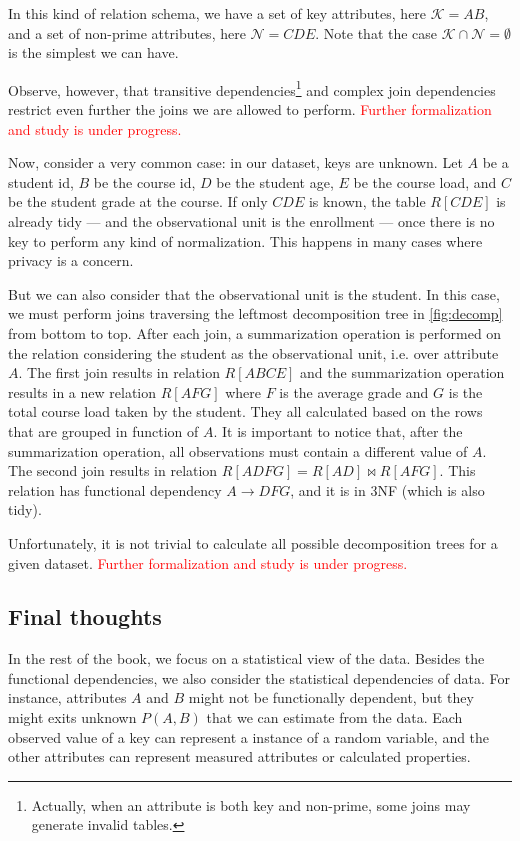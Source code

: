 In this kind of relation schema, we have a set of key attributes, here $\mathcal{K} = AB$,
and a set of non-prime attributes, here $\mathcal{N} = CDE$.  Note that the case
$\mathcal{K} \cap \mathcal{N} = \emptyset$ is the simplest we can have.

Observe, however, that transitive dependencies\footnote{Actually, when an attribute is
both key and non-prime, some joins may generate invalid tables.} and complex join
dependencies restrict even further the joins we are allowed to perform.
\textcolor{red}{Further formalization and study is under progress.}

Now, consider a very common case: in our dataset, keys are unknown.  Let $A$ be a student
id, $B$ be the course id, $D$ be the student age, $E$ be the course load, and $C$ be the
student grade at the course.  If only $CDE$ is known, the table $R[CDE]$ is already tidy
--- and the observational unit is the enrollment --- once there is no key to perform any
kind of normalization.  This happens in many cases where privacy is a concern.

But we can also consider that the observational unit is the student.  In this case, we
must perform joins traversing the leftmost decomposition tree in \cref{fig:decomp} from
bottom to top.  After each join, a summarization operation is performed on the relation
considering the student as the observational unit, i.e. over attribute $A$.  The first
join results in relation $R[ABCE]$ and the summarization operation results in a new
relation $R[AFG]$ where $F$ is the average grade and $G$ is the total course load taken by
the student.  They all calculated based on the rows that are grouped in function of $A$.
It is important to notice that, after the summarization operation, all observations must
contain a different value of $A$.  The second join results in relation $R[ADFG] = R[AD]
\bowtie R[AFG]$.  This relation has functional dependency $A \to DFG$, and it is in 3NF
(which is also tidy).

Unfortunately, it is not trivial to calculate all possible decomposition trees for a given
dataset.  \textcolor{red}{Further formalization and study is under progress.}

\subsection{Final thoughts}

In the rest of the book, we focus on a statistical view of the data.  Besides the
functional dependencies, we also consider the statistical dependencies of data.  For
instance, attributes $A$ and $B$ might not be functionally dependent, but they might exits
unknown $P(A, B)$ that we can estimate from the data.  Each observed value of a key can
represent a instance of a random variable, and the other attributes can represent
measured attributes or calculated properties.


